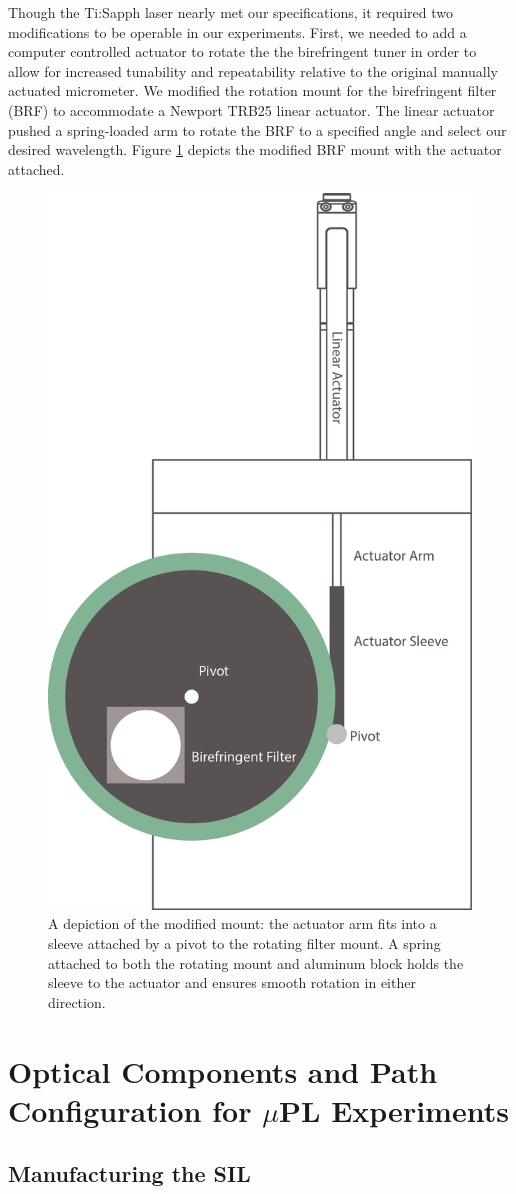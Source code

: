 \indent Though the Ti:Sapph laser nearly met our specifications, it required two modifications to be operable in our experiments. First, we needed to add a computer controlled actuator to rotate the the birefringent tuner in order to allow for increased tunability and repeatability relative to the original manually actuated micrometer. We modified the rotation mount for the birefringent filter (BRF) to accommodate a Newport TRB25 linear actuator. The linear actuator pushed a spring-loaded arm to rotate the BRF to a specified angle and select our desired wavelength. Figure \ref{brfmount} depicts the modified BRF mount with the actuator attached.
\begin{figure}[h!]
\centering
\includegraphics[width = .35\textwidth]{Actuator.png}
\caption{ \doublespacing A depiction of the modified mount: the actuator arm fits into a sleeve attached by a pivot to the rotating filter mount. A spring attached to both the rotating mount and aluminum block holds the sleeve to the actuator and ensures smooth rotation in either direction.}
\label{brfmount}
\end{figure}

\section{Optical Components and Path Configuration for $\mu$PL Experiments}

\subsection{Manufacturing the SIL}

